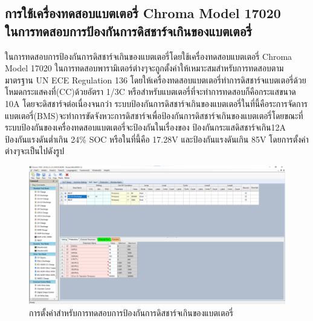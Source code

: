 \subsection{การใช้เครื่องทดสอบแบตเตอรี่ Chroma Model 17020 \\ ในการทดสอบการป้องกันการดิสชาร์จเกินของแบตเตอรี่}
ในการทดสอบการป้องกันการดิสชาร์จเกินของแบตเตอรี่โดยใช้เครื่องทดสอบแบตเตอรี่ Chroma Model 17020 ในการทดสอบพารามิเตอร์ต่างๆจะถูกตั้งค่าให้เหมาะสมสำหรับการทดสอบตามมาตรฐาน UN ECE Regulation 136 โดยให้เครื่องทดสอบแบตเตอรี่ทำการดิสชาร์จแบตเตอรี่ด้วยโหมดกระแสคงที่(CC)ด้วยอัตรา 1/3C หรือสำหรับแบตเตอรี่ที่จะทำการทดสอบก็คือกระแสขนาด 10A โดยจะดิสชาร์จต่อเนื่องจนกว่า
ระบบป้องกันการดิสชาร์จเกินของแบตเตอรี่ในที่นี้คือระการจัดการแบตเตอรี่(BMS)จะทำการขัดจังหวะการดิสชาร์จเพื่อป้องกันการดิสชาร์จเกินของแบตเตอรี่โดยขณะที่ระบบป้องกันของเครื่องทดสอบแบตเตอรี่จะป้องกันในเรื่องของ
ป้องกันกระแสดิสชาร์จเกิน12A ป้องกันแรงดันต่ำเกิน 24\% SOC หรือในที่นี้คือ 17.28V และป้องกันแรงดันเกิน 85V โดยการตั้งค่าต่างๆจะเป็นไปดังรูป
\begin{center}
	\begin{figure}[H]
		\includegraphics[width=1\linewidth]{Chapters/img/R136_DEMO/UUT_TEST_OVDCP.png}
		\centering
		\captionsetup{justification=centering,margin=2cm}
		\caption{การตั้งค่าสำหรับการทดสอบการป้องกันการดิสชาร์จเกินของแบตเตอรี่}
	\end{figure}
\end{center}
















